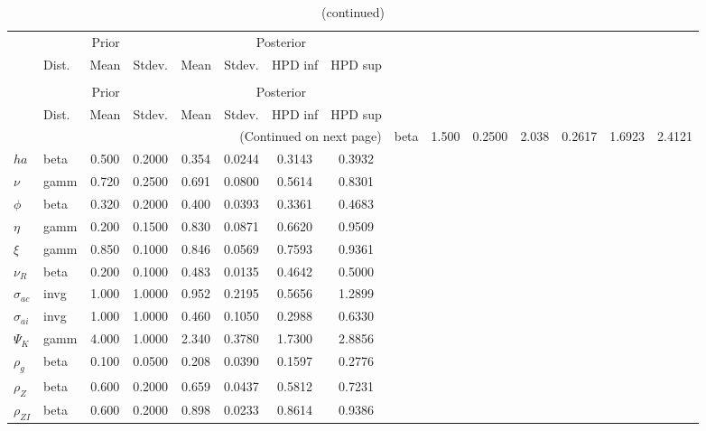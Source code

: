  
\begin{center}
\begin{longtable}{llcccccc} 
\caption{Results from Metropolis-Hastings (parameters)}
 \label{Table:MHPosterior:1}\\
\toprule 
  & \multicolumn{3}{c}{Prior}  &  \multicolumn{4}{c}{Posterior} \\
  \cmidrule(r{.75em}){2-4} \cmidrule(r{.75em}){5-8}
  & Dist. & Mean  & Stdev. & Mean & Stdev. & HPD inf & HPD sup\\
\midrule \endfirsthead 
\caption{(continued)}\\\toprule 
  & \multicolumn{3}{c}{Prior}  &  \multicolumn{4}{c}{Posterior} \\
  \cmidrule(r{.75em}){2-4} \cmidrule(r{.75em}){5-8}
  & Dist. & Mean  & Stdev. & Mean & Stdev. & HPD inf & HPD sup\\
\midrule \endhead 
\bottomrule \multicolumn{8}{r}{(Continued on next page)} \endfoot 
\bottomrule \endlastfoot 
${\sigma}$ & beta &   1.500 & 0.2500 &   2.038& 0.2617 &  1.6923 &  2.4121 \\ 
${ha}$ & beta &   0.500 & 0.2000 &   0.354& 0.0244 &  0.3143 &  0.3932 \\ 
$\nu$ & gamm &   0.720 & 0.2500 &   0.691& 0.0800 &  0.5614 &  0.8301 \\ 
${\phi}$ & beta &   0.320 & 0.2000 &   0.400& 0.0393 &  0.3361 &  0.4683 \\ 
${\eta}$ & gamm &   0.200 & 0.1500 &   0.830& 0.0871 &  0.6620 &  0.9509 \\ 
$\xi$ & gamm &   0.850 & 0.1000 &   0.846& 0.0569 &  0.7593 &  0.9361 \\ 
${\nu_R}$ & beta &   0.200 & 0.1000 &   0.483& 0.0135 &  0.4642 &  0.5000 \\ 
${\sigma_{ac}}$ & invg &   1.000 & 1.0000 &   0.952& 0.2195 &  0.5656 &  1.2899 \\ 
${\sigma_{ai}}$ & invg &   1.000 & 1.0000 &   0.460& 0.1050 &  0.2988 &  0.6330 \\ 
${\Psi_{K}}$ & gamm &   4.000 & 1.0000 &   2.340& 0.3780 &  1.7300 &  2.8856 \\ 
${\rho_g}$ & beta &   0.100 & 0.0500 &   0.208& 0.0390 &  0.1597 &  0.2776 \\ 
${\rho_Z}$ & beta &   0.600 & 0.2000 &   0.659& 0.0437 &  0.5812 &  0.7231 \\ 
${\rho_{ZI}}$ & beta &   0.600 & 0.2000 &   0.898& 0.0233 &  0.8614 &  0.9386 \\ 

\end{longtable}
\end{center}
